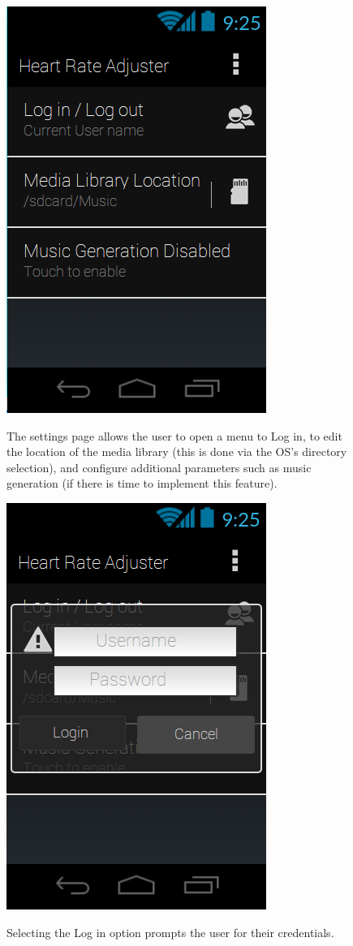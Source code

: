 \documentclass[letterpaper,english]{scrreprt}
\begin{document}
\begin{figure}[H]
	\centering
	\includegraphics{mobile_ui/3.png}\\
	\caption{The settings page allows the user to open a menu to Log in, to edit the location of the media library (this is done via the OS's directory selection), and configure additional parameters such as music generation (if there is time to implement this feature).}
\end{figure}

\begin{figure}[H]
	\centering
	\includegraphics{mobile_ui/4.png}\\
	\caption{Selecting the Log in option prompts the user for their credentials.}
\end{figure}
\end{document}
